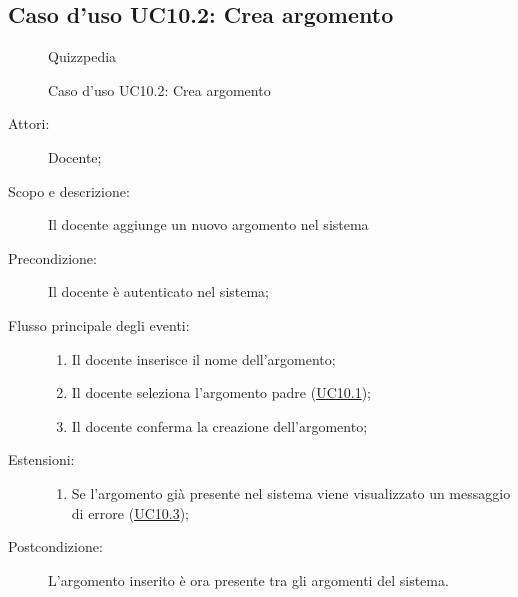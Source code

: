 \subsection{Caso d'uso UC10.2: Crea argomento}
        \begin{figure}[H]
            \centering
            \begin{resizedtikzpicture}{\textwidth}
		\begin{umlsystem}[x=0, fill=lightgray!20]{Quizzpedia}
		\end{umlsystem}
            \end{resizedtikzpicture}
            \caption{Caso d'uso UC10.2: Crea argomento}
            \label{fig:UC10.2} 
        \end{figure}
    \begin{description}
\item[Attori:] Docente;
\item[Scopo e descrizione:] Il docente aggiunge un nuovo argomento nel sistema
      \item[Precondizione:] Il docente è autenticato nel sistema;

        \item[Flusso principale degli eventi:] \begin{enumerate}
          \item Il docente inserisce il nome dell'argomento;
          \item Il docente seleziona l'argomento padre (\hyperlink{UC10.1}{UC10.1});
          \item Il docente conferma la creazione dell'argomento;

      \end{enumerate}
    \item[Estensioni:]
      \begin{enumerate}
          \item Se l'argomento già presente nel sistema viene visualizzato un messaggio di errore (\hyperlink{UC10.3}{UC10.3});

      \end{enumerate}
    \item[Postcondizione:] L'argomento inserito è ora presente tra gli argomenti del sistema.
  \end{description}
\hypertarget{UC10.3}{}
